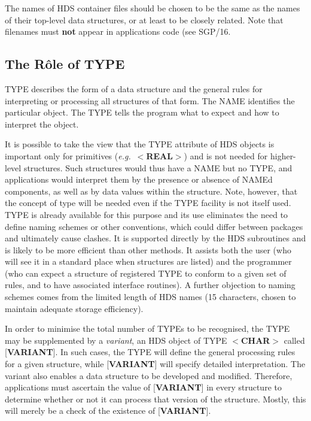 \documentclass[twoside,11pt]{article}
\newcommand{\xref}[3]{#1}
\newcommand{\xlabel}[1]{}
\renewcommand{\_}{\texttt{\symbol{95}}}
\begin{document}
The names of HDS container files should be chosen to be the
same as the names of their top-level data structures, or at
least to be closely related.  Note that filenames must {\bf not}
appear in applications code (see \xref{SGP/16}{sgp16}).

\subsection{\xlabel{se_roleoftype}The R\^{o}le of TYPE\label{se:roleoftype}}

TYPE describes the form of a data structure and the general rules
for interpreting or processing all structures of that form.  The NAME
identifies the particular object.  The TYPE tells the program what to 
expect and how to interpret the object.

It is possible to take the view that the TYPE attribute
of HDS objects is important only for
primitives ({\it e.g.}\  $<${\bf \_REAL}$>$) and is not needed for
higher-level structures.
Such structures would thus have a NAME but no TYPE, and applications
would interpret them by the presence or absence of NAMEd components, as
well as by data values within the structure.
Note, however, that the concept of type will be needed even if the
TYPE facility is not itself used.
TYPE is already available for this purpose and its use eliminates
the need to define naming schemes or other conventions, which could
differ between packages and ultimately cause clashes.  It is supported
directly by the HDS subroutines and is likely to be more efficient than
other methods.  It assists both the user (who will see it in a standard
place when structures are listed) and the programmer (who can expect a
structure of registered TYPE to conform to a given set of rules,
and to have associated interface routines).  A
further objection to naming schemes comes from the limited length of HDS
names (15 characters, chosen to maintain adequate storage efficiency). 

In order to minimise the total number of TYPEs to be recognised, 
the TYPE may be supplemented by
a {\it variant}, an HDS object
of TYPE $<${\bf \_CHAR}$>$
called [{\bf VARIANT}{]}.  In such cases,
the TYPE will define the general processing rules for a given
structure, while
{[}{\bf VARIANT}{]}
will specify detailed interpretation.  The variant also enables a data
structure to be developed and modified.  Therefore, applications must
ascertain the value of {[}{\bf VARIANT}{]} in every structure to
determine whether or not it can process that version of the structure. 
Mostly, this will merely be a check of the existence of {[}{\bf VARIANT}{]}.
\end{document}
